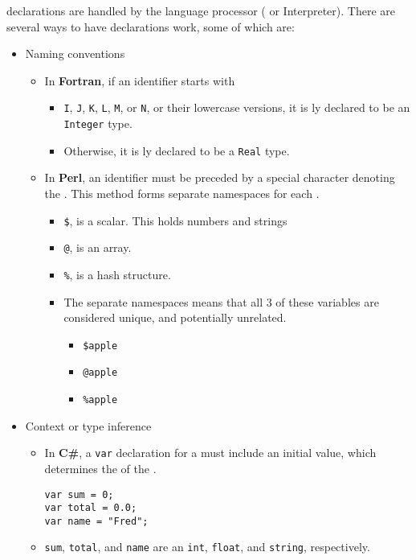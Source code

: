  declarations are handled by the language processor ( or Interpreter).
There are several ways to have  declarations work, some of which are:
\begin{itemize}[noitemsep]
\item Naming conventions
  \begin{itemize}[noitemsep]
  \item In \textbf{Fortran}, if an identifier starts with
    \begin{itemize}[noitemsep]
    \item \texttt{I}, \texttt{J}, \texttt{K}, \texttt{L}, \texttt{M}, or \texttt{N}, or their lowercase versions, it is ly declared to be an \texttt{Integer} type.
    \item Otherwise, it is ly declared to be a \texttt{Real} type.
    \end{itemize}
  \item In \textbf{Perl}, an identifier must be preceded by a special character denoting the . This method forms separate namespaces for each  .
    \begin{itemize}[noitemsep]
    \item \texttt{\$}, is a scalar. This holds numbers and strings
    \item \texttt{@}, is an array.
    \item \texttt{\%}, is a hash structure.
    \item The separate namespaces means that all 3 of these variables are considered unique, and potentially unrelated.
      \begin{itemize}[noitemsep]
      \item \texttt{\$apple}
      \item \texttt{@apple}
      \item \texttt{\%apple}
      \end{itemize}
    \end{itemize}
  \end{itemize}
  
\item Context or type inference
  \begin{itemize}[noitemsep]
  \item In \textbf{C\#}, a \texttt{var} declaration for a  must include an initial value, which determines the  of the .
\begin{verbatim}
var sum = 0;
var total = 0.0;
var name = "Fred";
\end{verbatim}
  \item \texttt{sum}, \texttt{total}, and \texttt{name} are an \texttt{int}, \texttt{float}, and \texttt{string}, respectively.
  \end{itemize}
\end{itemize}

